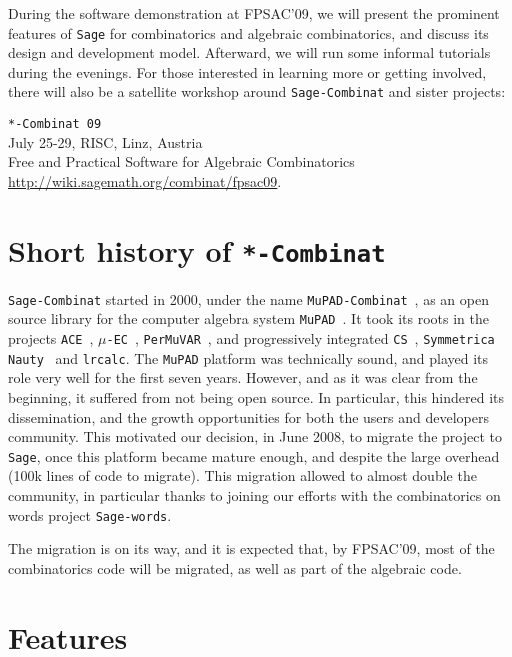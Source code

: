 \documentclass[proceedings,submission]{dmtcs}
\begin{document}
During the software demonstration at FPSAC'09, we will present the
prominent features of \texttt{Sage} for combinatorics and algebraic
combinatorics, and discuss its design and development
model. Afterward, we will run some informal tutorials during the
evenings. For those interested
in learning more or getting involved, there will also be a satellite
workshop around \texttt{Sage-Combinat} and sister projects:

\noindent
\texttt{*-Combinat 09}\\
July 25-29, RISC, Linz, Austria\\
Free and Practical Software for Algebraic Combinatorics\\
\url{http://wiki.sagemath.org/combinat/fpsac09}.


\section{Short history of \texttt{*-Combinat}}

\texttt{Sage-Combinat} started in 2000, under the name
\texttt{MuPAD-Combinat}~\cite{Hivert_Thiery.MuPAD-Combinat.2004}, as
an open source library for the computer algebra system
\texttt{MuPAD}~\cite{MuPAD.96}. It took its roots in the projects
\texttt{ACE}~\cite{ACE}, $\mu$\texttt{-EC}~\cite{muEC},
\texttt{PerMuVAR}~\cite{Thiery.PerMuVAR}, and progressively integrated
\texttt{CS}~\cite{Denise_all.1998.CS},
\texttt{Symmetrica}~\cite{SYMMETRICA}
\texttt{Nauty}~\cite{McKay.nauty} and \texttt{lrcalc}. The
\texttt{MuPAD} platform was technically sound, and played its role
very well for the first seven years. However, and as it was clear from
the beginning, it suffered from not being open source. In particular,
this hindered its dissemination, and the growth opportunities for both
the users and developers community. This motivated our decision, in
June 2008, to migrate the project to \texttt{Sage}, once this platform
became mature enough, and despite the large overhead (100k lines of
code to migrate). This migration allowed to almost double the
community, in particular thanks to joining our efforts with the
combinatorics on words project \texttt{Sage-words}.

The migration is on its way, and it is expected that, by FPSAC'09,
most of the combinatorics code will be migrated, as well as part of
the algebraic code.




\section{Features}
\label{section.sage}
\end{document}
